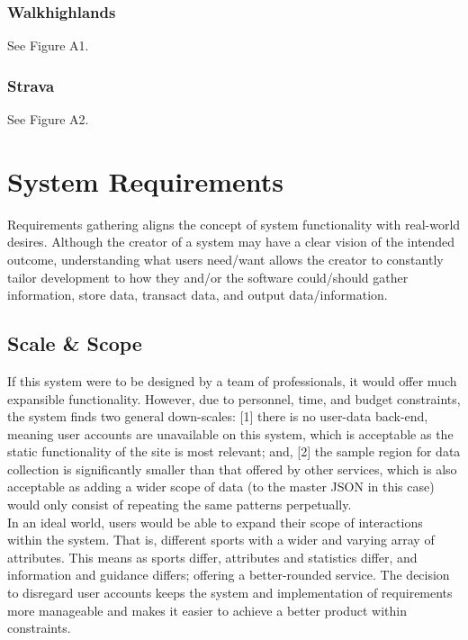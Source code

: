 \documentclass[11pt, english]{article}
\begin{document}
		\subsubsection{Walkhighlands}

	See Figure A1.

		\subsubsection{Strava}

	See Figure A2.

\newpage

\section{System Requirements}\label{ch3}

	Requirements gathering aligns the concept of system functionality with real-world desires. Although the creator of a system may have a clear vision of the intended outcome, understanding what users need/want allows the creator to constantly tailor development to how they and/or the software could/should gather information, store data, transact data, and output data/information.

	\subsection{Scale \& Scope}

	If this system were to be designed by a team of professionals, it would offer much expansible functionality. However, due to personnel, time, and budget constraints, the system finds two general down-scales: [1] there is no user-data back-end, meaning user accounts are unavailable on this system, which is acceptable as the static functionality of the site is most relevant; and, [2] the sample region for data collection is significantly smaller than that offered by other services, which is also acceptable as adding a wider scope of data (to the master JSON in this case) would only consist of repeating the same patterns perpetually.\\

	In an ideal world, users would be able to expand their scope of interactions within the system. That is, different sports with a wider and varying array of attributes. This means as sports differ, attributes and statistics differ, and information and guidance differs; offering a better-rounded service. The decision to disregard user accounts keeps the system and implementation of requirements more manageable and makes it easier to achieve a better product within constraints. 
\end{document}
